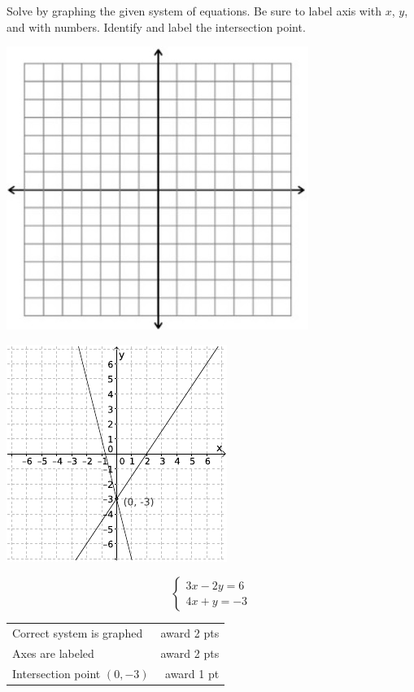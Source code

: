 {
	Solve by graphing the given system of equations. Be sure to label axis with $x$, $y$, and with numbers. Identify and label the intersection point. \begin{onlyproblem}\begin{center}\includegraphics{fig-graphpaper.png}\end{center}\end{onlyproblem} \begin{onlysolution}\begin{center}\includegraphics{fig095-10-c-answer}\end{center}\end{onlysolution}
	$$\begin{cases}3x-2y=6\\ 4x+y=-3\end{cases}$$
}
{
	\begin{tabular}{l r}
	Correct system is graphed & award 2 pts\\
	Axes are labeled & award 2 pts\\
	Intersection point $(0,-3)$ & award 1 pt
	\end{tabular}
}

